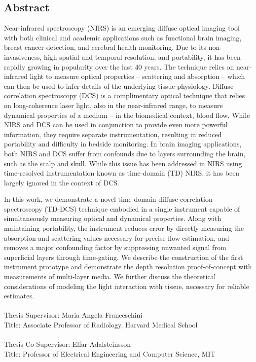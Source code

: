 \subsection*{Abstract}{
Near-infrared spectroscopy (NIRS) is an emerging diffuse optical imaging tool with both clinical and academic applications such as functional brain imaging, breast cancer detection, and cerebral health monitoring. Due to its non-invasiveness, high spatial and temporal resolution, and portability, it has been rapidly growing in popularity over the last 40 years. The technique relies on near-infrared light to measure optical properties -- scattering and absorption -- which can then be used to infer details of the underlying tissue physiology. Diffuse correlation spectroscopy (DCS)  is a complimentary optical technique that relies on long-coherence laser light, also in the near-infrared range, to measure dynamical properties of a medium -- in the biomedical context, blood flow. While NIRS and DCS can be used in conjunction to provide even more powerful information, they require separate instrumentation, resulting in reduced portability and difficulty in bedside monitoring. In brain imaging applications, both NIRS and DCS suffer from confounds due to layers surrounding the brain, such as the scalp and skull. While this issue has been addressed in NIRS using time-resolved instrumentation known as time-domain (TD) NIRS, it has been largely ignored in the context of DCS. 

In this work, we demonstrate a novel time-domain diffuse correlation spectroscopy (TD-DCS) technique embodied in a single instrument capable of simultaneously measuring optical and dynamical properties. Along with maintaining portability, the instrument reduces error by directly measuring the absorption and scattering values necessary for precise flow estimation, and removes a major confounding factor by suppressing unwanted signal from superficial layers through time-gating. We describe the construction of the first instrument prototype and demonstrate the depth resolution proof-of-concept with measurements of multi-layer media. We further discuss the theoretical considerations of modeling the light interaction with tissue, necessary for reliable estimates.
\\
\\
Thesis Supervisor: Maria Angela Franceschini \\ 
Title: Associate Professor of Radiology, Harvard Medical School
\\
\\
Thesis Co-Supervisor: Elfar Adalsteinsson \\ 
Title: Professor of Electrical Engineering and Computer Science, MIT
}
\cleardoublepage

